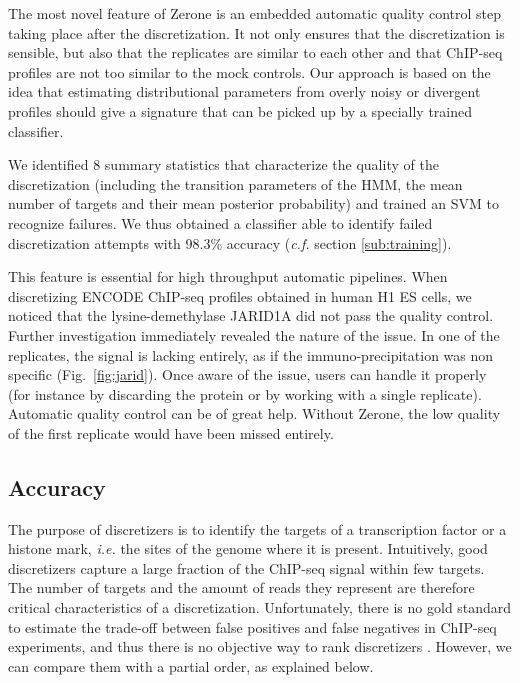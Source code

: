 \documentclass{bioinfo}
\begin{document}
The most novel feature of Zerone is an embedded automatic quality
control step taking place after the discretization. It not only
ensures that the discretization is sensible, but also that the
replicates are similar to each other and that ChIP-seq profiles
are not too similar to the mock controls. Our approach is based
on the idea that estimating distributional parameters from
overly noisy or divergent profiles should give a signature that
can be picked up by a specially trained classifier.

We identified 8 summary statistics that characterize the quality of
the discretization (including the transition parameters of the HMM,
the mean number of targets and their mean posterior probability)
and trained an SVM to recognize failures. We thus obtained a
classifier able to identify failed discretization attempts
with 98.3\% accuracy (\textit{c.f.} section \ref{sub:training}).

This feature is essential for high throughput automatic pipelines.
When discretizing ENCODE ChIP-seq profiles obtained in human H1
ES cells, we noticed that the lysine-demethylase JARID1A did
not pass the quality control.
Further investigation immediately revealed the nature of the issue.
In one of the replicates, the signal is lacking entirely, as if
the immuno-precipitation was non specific (Fig.~\ref{fig:jarid}).
Once aware of the issue, users can handle it properly (for instance
by discarding the protein or by working with a single replicate).
Automatic quality control can be of great help. Without Zerone, 
the low quality of the first replicate would have been missed
entirely.

\subsection{Accuracy}
The purpose of discretizers is to identify the targets of a
transcription factor or a histone mark, \textit{i.e.} the sites of
the genome where it is present.
Intuitively, good discretizers capture a large fraction of the
ChIP-seq signal within few targets. The number of targets
and the amount of reads they represent are therefore critical
characteristics of a discretization. Unfortunately, there is no gold
standard to estimate the trade-off between false positives and false
negatives in ChIP-seq experiments, and thus there is no objective way
to rank discretizers \citep{pmid21059603}. However, we can compare
them with a partial order, as explained below.
\end{document}
